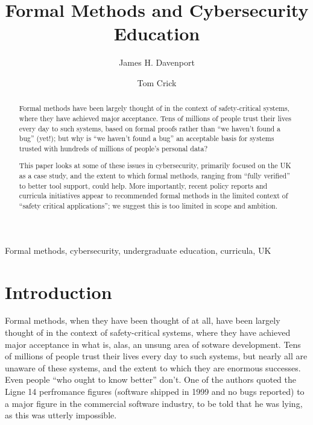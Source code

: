 \documentclass{llncs}
\begin{document}
\title{Formal Methods and Cybersecurity Education}

\author{James H. Davenport \and Tom Crick}


\maketitle

\begin{abstract}
Formal methods have been largely thought of in the context of safety-critical systems, where they have achieved major acceptance. Tens of millions of people trust their lives every day to such systems, based on formal proofs rather than ``we haven't found a bug'' (yet!); but why is ``we haven't found a bug'' an acceptable basis for systems trusted with hundreds of millions of people's personal data?

This paper looks at some of these issues in cybersecurity, primarily focused on the UK as a case study, and the extent to which formal methods, ranging from ``fully verified'' to better tool support, could help. More importantly, recent policy reports and curricula initiatives appear to recommended formal methods in the limited context of ``safety critical applications''; we suggest this is too limited in scope and ambition.
\end{abstract}

\begin{keywords}
Formal methods, cybersecurity, undergraduate education, curricula, UK
\end{keywords}

\section{Introduction}
Formal methods, when they have been thought of at all, have been largely thought of in the context of safety-critical systems, where they have achieved major acceptance in what is, alas, an unsung area of sotware development.  Tens of millions of people trust their lives every day to such systems, but nearly all are unaware of these systems, and the extent to which they are enormous successes. Even people ``who ought to know better'' don't. One of the authors quoted the Ligne 14 perfromance figures (software shipped in 1999 and no bugs reported) to a major figure in the commercial software industry, to be told that he was lying, as this was utterly impossible.
\end{document}
